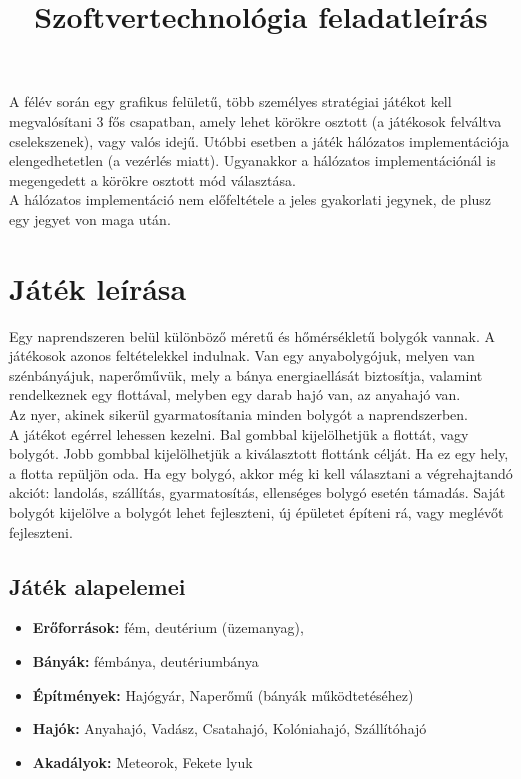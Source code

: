 \documentclass[12pt,a4paper]{article}
\title{Szoftvertechnológia feladatleírás}
\begin{document}
\maketitle
A félév során egy grafikus felületű, több személyes stratégiai játékot kell megvalósítani 3 fős csapatban, amely lehet körökre osztott (a játékosok felváltva cselekszenek), vagy valós idejű. Utóbbi esetben a játék hálózatos implementációja elengedhetetlen (a vezérlés miatt). Ugyanakkor a hálózatos implementációnál is megengedett a körökre osztott mód választása. \\

A hálózatos implementáció nem előfeltétele a jeles gyakorlati jegynek, de plusz egy jegyet von maga után.

\section{Játék leírása}
Egy naprendszeren belül különböző méretű és hőmérsékletű bolygók vannak. A játékosok azonos feltételekkel indulnak. Van egy anyabolygójuk, melyen van szénbányájuk, naperőművük, mely a bánya energiaellását biztosítja, valamint rendelkeznek egy flottával, melyben egy darab hajó van, az anyahajó van. \\

Az nyer, akinek sikerül gyarmatosítania minden bolygót a naprendszerben. \\

A játékot egérrel lehessen kezelni. Bal gombbal kijelölhetjük a flottát, vagy bolygót. Jobb gombbal kijelölhetjük a kiválasztott flottánk célját. Ha ez egy hely, a flotta repüljön oda. Ha egy bolygó, akkor még ki kell választani a végrehajtandó akciót: landolás, szállítás, gyarmatosítás, ellenséges bolygó esetén támadás. Saját bolygót kijelölve a bolygót lehet fejleszteni, új épületet építeni rá, vagy meglévőt fejleszteni. \\

\subsection{Játék alapelemei}
\begin{itemize}
\item \textbf{Erőforrások:} fém, deutérium (üzemanyag), 
\item \textbf{Bányák:} fémbánya, deutériumbánya
\item \textbf{Építmények:} Hajógyár, Naperőmű (bányák működtetéséhez)
\item \textbf{Hajók:} Anyahajó, Vadász, Csatahajó, Kolóniahajó, Szállítóhajó
\item \textbf{Akadályok:} Meteorok, Fekete lyuk 
\end{itemize}
\end{document}
